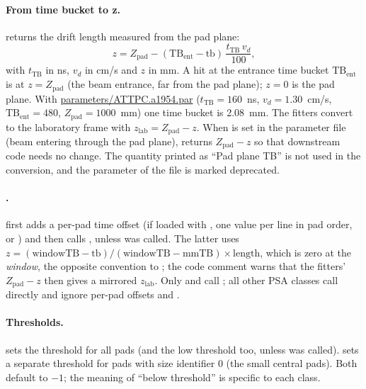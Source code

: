 \paragraph{From time bucket to z.}  returns the drift length measured from
the pad plane:
\begin{equation}
  z = Z_\mathrm{pad} - (\mathrm{TB}_\mathrm{ent} - \mathrm{tb})\,
      \frac{t_\mathrm{TB}\,v_d}{100},
\end{equation}
with $t_\mathrm{TB}$ in ns, $v_d$ in cm/\textmu s and $z$ in mm. A hit at the entrance time
bucket $\mathrm{TB}_\mathrm{ent}$ is at $z = Z_\mathrm{pad}$ (the beam entrance, far from the pad
plane); $z = 0$ is the pad plane. With \url{parameters/ATTPC.a1954.par} ($t_\mathrm{TB} = 160$~ns,
$v_d = 1.30$~cm/\textmu s, $\mathrm{TB}_\mathrm{ent} = 480$, $Z_\mathrm{pad} = 1000$~mm) one time
bucket is 2.08~mm. The fitters convert to the laboratory frame with $z_\mathrm{lab} = Z_\mathrm{pad}
- z$. When  is set in the parameter file (beam entering through the pad plane),
 returns $Z_\mathrm{pad} - z$ so that downstream code needs no change. The
quantity  printed as ``Pad plane TB'' is not used in the conversion, and the parameter
 of the file is marked deprecated.

\paragraph{.}  first adds a per-pad time offset (if
loaded with , one value per line in pad order, or
) and then calls , unless  was called. The latter uses $z = (\mathrm{windowTB} - \mathrm{tb}) /
(\mathrm{windowTB} - \mathrm{mmTB}) \times \mathrm{length}$, which is zero at the \emph{window},
the opposite convention to ; the code comment warns that the fitters' $Z_\mathrm{pad}
- z$ then gives a mirrored $z_\mathrm{lab}$. Only  and  call
; all other PSA classes call  directly and ignore per-pad
offsets and .

\paragraph{Thresholds.}  sets the threshold for all pads (and the low
threshold too, unless  was called).  sets a separate
threshold for pads with size identifier 0 (the small central pads). Both default to $-1$; the
meaning of ``below threshold'' is specific to each class.


